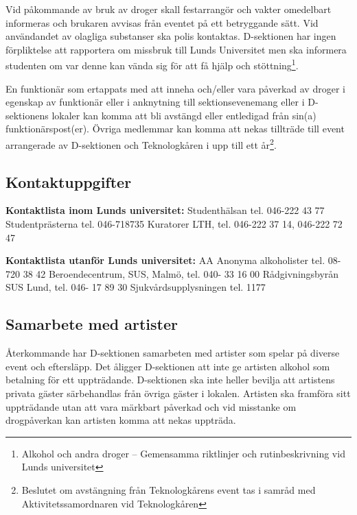 \documentclass[]{dsekprotokoll}
\begin{document}
Vid påkommande av bruk av droger skall festarrangör och vakter omedelbart informeras och brukaren avvisas från eventet på ett betryggande sätt. Vid användandet av olagliga substanser ska polis kontaktas. D-sektionen har ingen förpliktelse att rapportera om missbruk till Lunds Universitet men ska informera studenten om var denne kan vända sig för att få hjälp och stöttning\footnote{Alkohol och andra droger – Gemensamma riktlinjer och rutinbeskrivning vid Lunds universitet}.

En funktionär som ertappats med att inneha och/eller vara påverkad av droger i egenskap av funktionär eller i anknytning till sektionsevenemang eller i D-sektionens lokaler kan komma att bli avstängd eller entledigad från sin(a) funktionärspost(er). Övriga medlemmar kan komma att nekas tillträde till event arrangerade av D-sektionen och Teknologkåren i upp till ett år\footnote{Beslutet om avstängning från Teknologkårens event  tas i samråd med Aktivitetssamordnaren vid Teknologkåren}.

\subsection{Kontaktuppgifter}
\textbf{Kontaktlista inom Lunds universitet:}\newline
Studenthälsan tel. 046-222 43 77 \newline
Studentprästerna tel. 046-718735\newline
Kuratorer LTH, tel. 046-222 37 14, 046-222 72 47

\textbf{Kontaktlista utanför Lunds universitet:}\newline
AA Anonyma alkoholister tel. 08-720 38 42\newline
Beroendecentrum, SUS, Malmö, tel. 040- 33 16 00\newline
Rådgivningsbyrån SUS Lund, tel. 046- 17 89 30\newline
Sjukvårdsupplysningen tel. 1177

\subsection{Samarbete med artister}
Återkommande har D-sektionen samarbeten med artister som spelar på diverse event och eftersläpp. Det åligger D-sektionen att inte ge artisten alkohol som betalning för ett uppträdande. D-sektionen ska inte heller bevilja att artistens privata gäster särbehandlas
från övriga gäster i lokalen. Artisten ska framföra sitt uppträdande utan att vara märkbart
påverkad och vid misstanke om drogpåverkan kan artisten komma att nekas uppträda.
\end{document}

